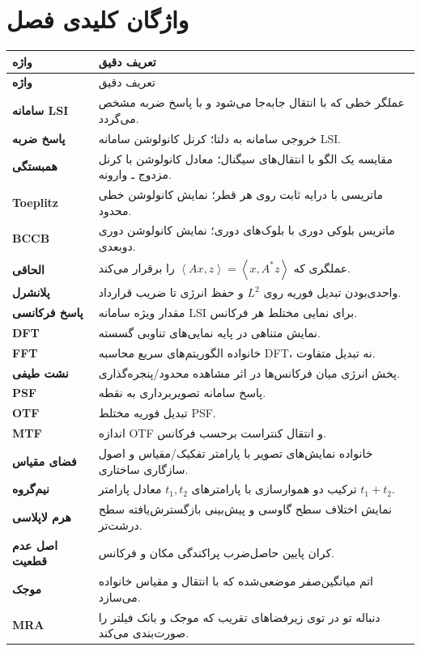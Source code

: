 \documentclass[12pt,openany,oneside]{book}
\newcommand{\inner}[2]{\left\langle #1,#2\right\rangle}
\begin{document}
\section{واژگان کلیدی فصل}

\begin{longtable}{>{\bfseries}p{}p{}}
\toprule
واژه & تعریف دقیق\\
\midrule
\endfirsthead
\toprule
واژه & تعریف دقیق\\
\midrule
\endhead
سامانه LSI & عملگر خطی که با انتقال جابه‌جا می‌شود و با پاسخ ضربه مشخص می‌گردد.\\
پاسخ ضربه & خروجی سامانه به دلتا؛ کرنل کانولوشن سامانه LSI.\\
همبستگی & مقایسه یک الگو با انتقال‌های سیگنال؛ معادل کانولوشن با کرنل مزدوج ـ وارونه.\\
Toeplitz & ماتریسی با درایه ثابت روی هر قطر؛ نمایش کانولوشن خطی محدود.\\
BCCB & ماتریس بلوکی دوری با بلوک‌های دوری؛ نمایش کانولوشن دوری دوبعدی.\\
الحاقی & عملگری که \(\inner{Ax}{z}=\inner{x}{A^*z}\) را برقرار می‌کند.\\
پلانشرل & واحدی‌بودن تبدیل فوریه روی \(L^2\) و حفظ انرژی تا ضریب قرارداد.\\
پاسخ فرکانسی & مقدار ویژه سامانه LSI برای نمایی مختلط هر فرکانس.\\
DFT & نمایش متناهی در پایه نمایی‌های تناوبی گسسته.\\
FFT & خانواده الگوریتم‌های سریع محاسبه DFT، نه تبدیل متفاوت.\\
نشت طیفی & پخش انرژی میان فرکانس‌ها در اثر مشاهده محدود/پنجره‌گذاری.\\
PSF & پاسخ سامانه تصویربرداری به نقطه.\\
OTF & تبدیل فوریه مختلط PSF.\\
MTF & اندازه OTF و انتقال کنتراست برحسب فرکانس.\\
فضای مقیاس & خانواده نمایش‌های تصویر با پارامتر تفکیک/مقیاس و اصول سازگاری ساختاری.\\
نیم‌گروه & ترکیب دو هموارسازی با پارامترهای \(t_1,t_2\) معادل پارامتر \(t_1+t_2\).\\
هرم لاپلاسی & نمایش اختلاف سطح گاوسی و پیش‌بینی بازگسترش‌یافته سطح درشت‌تر.\\
اصل عدم قطعیت & کران پایین حاصل‌ضرب پراکندگی مکان و فرکانس.\\
موجک & اتم میانگین‌صفر موضعی‌شده که با انتقال و مقیاس خانواده می‌سازد.\\
MRA & دنباله تو در توی زیرفضاهای تقریب که موجک و بانک فیلتر را صورت‌بندی می‌کند.\\

\end{longtable}
\end{document}
